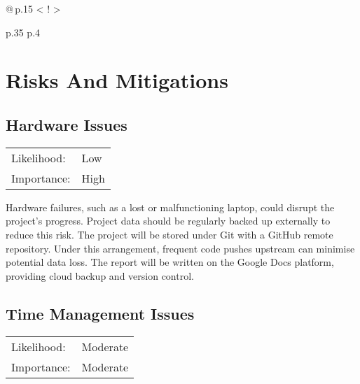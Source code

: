 \documentclass[]{final_report}
\newcommand{\foo}{\color{LightSteelBlue3}\makebox[0pt]{\textbullet}\hskip-0.5pt\vrule width 1pt\hspace{\labelsep}}
\begin{document}
\begin{table}
\begin{longtable}{@{\,}p{} <{\hskip 2pt} !{\foo} >{\raggedright\arraybackslash}p{.35\textwidth} p{.4\textwidth}}
\end{longtable}
\end{table}

\chapter{Risks And Mitigations}

\section{Hardware Issues}

\begin{center}
    \begin{tabular}{l l}
    Likelihood: & Low \\
    Importance: & High \\
    \end{tabular}
  \end{center}

Hardware failures, such as a lost or malfunctioning laptop, could disrupt the project's progress. Project data should be regularly backed up externally to reduce this risk. The project will be stored under Git with a GitHub remote repository. Under this arrangement, frequent code pushes upstream can minimise potential data loss. The report will be written on the Google Docs platform, providing cloud backup and version control.


\section{Time Management Issues}

\begin{center}
    \begin{tabular}{l l  }
    Likelihood: & Moderate \\
    Importance: & Moderate \\
    \end{tabular}
  \end{center}
\end{document}
